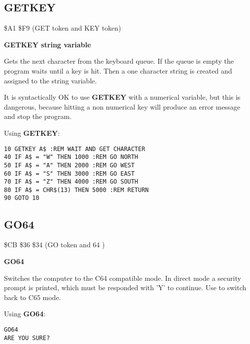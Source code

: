 \subsection{GETKEY}
\begin{description}[leftmargin=2cm,style=nextline]
\item [Token:] \$A1 \$F9 (GET token and KEY token)
\item [Format:] {\bf GETKEY string variable}
\item [Usage:] Gets the next character
               from the keyboard queue. If the queue is empty
               the program waits until a key is hit.
               Then a one character string is created
               and assigned to the string variable.

\item [Remarks:] It is syntactically OK to use {\bf GETKEY} with
               a numerical variable, but this is dangerous,
               because hitting a non numerical key will produce
               an error message and stop the program.

\item [Example:] Using {\bf GETKEY}:
\begin{tcolorbox}[colback=black,coltext=white]
\verbatimfont{\codefont}
\begin{verbatim}
10 GETKEY A$ :REM WAIT AND GET CHARACTER
40 IF A$ = "W" THEN 1000 :REM GO NORTH
50 IF A$ = "A" THEN 2000 :REM GO WEST
60 IF A$ = "S" THEN 3000 :REM GO EAST
70 IF A$ = "Z" THEN 4000 :REM GO SOUTH
80 IF A$ = CHR$(13) THEN 5000 :REM RETURN
90 GOTO 10
\end{verbatim}
\end{tcolorbox}
\end{description}


\newpage
\subsection{GO64}
\begin{description}[leftmargin=2cm,style=nextline]
\item [Token:] \$CB \$36 \$34 (GO token and 64 )
\item [Format:] {\bf GO64}
\item [Usage:] Switches the
               computer to the C64 compatible mode. In direct
               mode a security prompt 
               is printed, which must be responded with 'Y' to
               continue. Use  to switch back
               to C65 mode.

\item [Example:] Using {\bf GO64}:
\begin{tcolorbox}[colback=black,coltext=white]
\verbatimfont{\codefont}
\begin{verbatim}
GO64
ARE YOU SURE?
\end{verbatim}
\end{tcolorbox}
\end{description}

